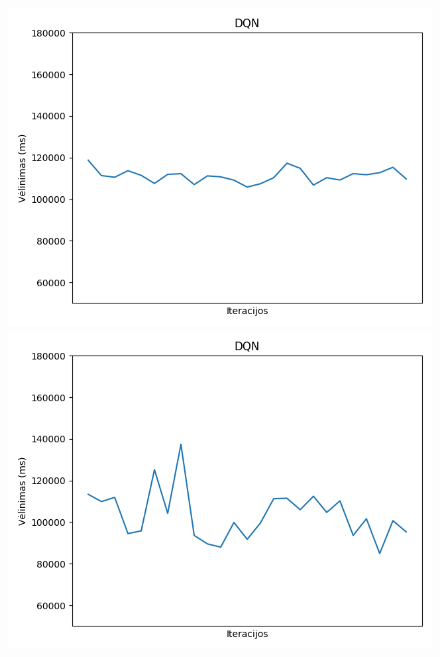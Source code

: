 \documentclass{VUMIFPSbakalaurinis}
\begin{document}
\begin{figure}[H]
    \centering
    \begin{minipage}[b]{0.4\textwidth}
        \includegraphics[width=\textwidth]{img/dqn_50_2.png}
    \end{minipage}
    \hspace{1mm}
    \begin{minipage}[b]{0.4\textwidth}
        \includegraphics[width=\textwidth]{img/dqn_100_2.png}
    \end{minipage}
    \hspace{1mm}
    \begin{minipage}[b]{0.4\textwidth}

\end{minipage}
\end{figure}
\end{document}
